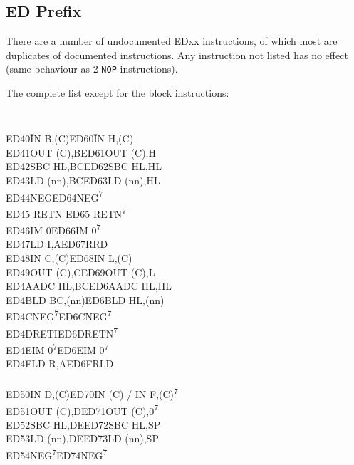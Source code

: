 \documentclass[12pt,twoside,openright,a4paper]{book}
\newcommand{\See}[1]{\textsuperscript{#1}}
\begin{document}
\subsection{ED Prefix \cite{gerton}}

There are a number of undocumented EDxx instructions, of which most are duplicates of documented instructions. Any instruction not listed has no effect (same behaviour as 2 {\tt NOP} instructions).

The complete list except for the block instructions:

\renewcommand{\thefootnote}{\fnsymbol{footnote}}
{}
{\tt 
	\begin{tabbing}
		{\qquad}ED40\quad\=IN B,(C)\qquad\qquad\=ED60\quad\=IN H,(C)\\ 
		{\qquad}ED41\>OUT (C),B\>ED61\>OUT (C),H\\ 
		{\qquad}ED42\>SBC HL,BC\>ED62\>SBC HL,HL\\  
		{\qquad}ED43\>LD (nn),BC\>ED63\>LD (nn),HL\\ 
		{\qquad}ED44\>NEG\>ED64\>NEG{\See{7}}\\ 
		{\qquad}ED45 \> RETN\> ED65\> RETN{\See{7}}\\
		{\qquad}ED46\>IM 0\>ED66\>IM 0{\See{7}}\\
		{\qquad}ED47\>LD I,A\>ED67\>RRD\\
		{\qquad}ED48\>IN C,(C)\>ED68\>IN L,(C)\\
		{\qquad}ED49\>OUT (C),C\>ED69\>OUT (C),L\\
		{\qquad}ED4A\>ADC HL,BC\>ED6A\>ADC HL,HL\\
		{\qquad}ED4B\>LD BC,(nn)\>ED6B\>LD HL,(nn)\\
		{\qquad}ED4C\>NEG{\See{7}}\>ED6C\>NEG{\See{7}}\\
		{\qquad}ED4D\>RETI\>ED6D\>RETN\See{7}\\
		{\qquad}ED4E\>IM 0{\See{7}}\>ED6E\>IM 0{\See{7}}\\
		{\qquad}ED4F\>LD R,A\>ED6F\>RLD\\
		{\qquad}\\
		{\qquad}ED50\>IN D,(C)\>ED70\>IN (C) / IN F,(C){\See{7}}\\
		{\qquad}ED51\>OUT (C),D\>ED71\>OUT (C),0{\See{7}}\\
		{\qquad}ED52\>SBC HL,DE\>ED72\>SBC HL,SP\\
		{\qquad}ED53\>LD (nn),DE\>ED73\>LD (nn),SP\\
		{\qquad}ED54\>NEG{\See{7}}\>ED74\>NEG{\See{7}}\\

\end{tabbing}}
\end{document}
